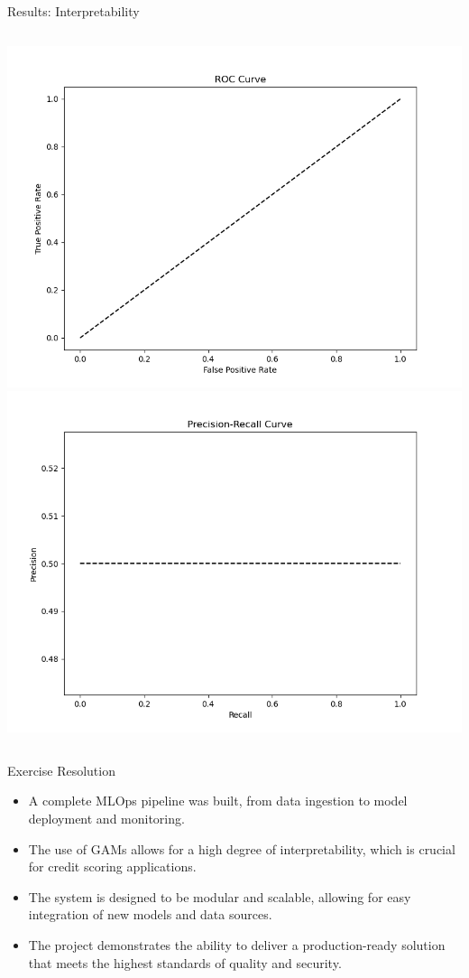 \documentclass{beamer}
\begin{document}
\begin{frame}{Results: Interpretability}
  \begin{columns}
    \includegraphics[width=\textwidth]{../reports/plots/roc_curve.png}
    \includegraphics[width=\textwidth]{../reports/plots/precision_recall_curve.png}
  \end{columns}
\end{frame}

\begin{frame}{Exercise Resolution}
  \begin{itemize}
    \item A complete MLOps pipeline was built, from data ingestion to model deployment and monitoring.
    \item The use of GAMs allows for a high degree of interpretability, which is crucial for credit scoring applications.
    \item The system is designed to be modular and scalable, allowing for easy integration of new models and data sources.
    \item The project demonstrates the ability to deliver a production-ready solution that meets the highest standards of quality and security.
  \end{itemize}
\end{frame}
\end{document}
